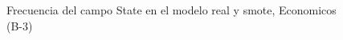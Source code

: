 \begin{figure}[H]
    \centering
    
    \caption{Frecuencia del campo State en el modelo real y smote, Economicos (B-3)}
    \label{frecuency-State-smote-enc}
\end{figure}